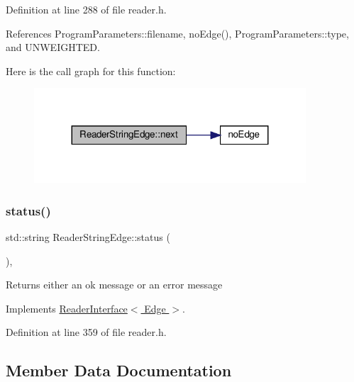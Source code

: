 Definition at line 288 of file reader.\+h.



References Program\+Parameters\+::filename, no\+Edge(), Program\+Parameters\+::type, and U\+N\+W\+E\+I\+G\+H\+T\+ED.

Here is the call graph for this function\+:
\nopagebreak
\begin{figure}[H]
\begin{center}
\leavevmode
\includegraphics[width=287pt]{classReaderStringEdge_a8de930135fa1fbb3a9610da2259e93ce_cgraph}
\end{center}
\end{figure}
\mbox{\label{classReaderStringEdge_a11fe073e85d07a48d0f0549b51af36b6}} 
\subsubsection{\texorpdfstring{status()}{status()}}
{\footnotesize\ttfamily std\+::string Reader\+String\+Edge\+::status (\begin{DoxyParamCaption}{ }\end{DoxyParamCaption})\hspace{0.3cm}{\ttfamily [inline]}, {\ttfamily [virtual]}}

\begin{DoxyReturn}{Returns}
either an ok message or an error message 
\end{DoxyReturn}


Implements \hyperlink{classReaderInterface_a5f86ed49eac808ed0a912f7d670c4042}{Reader\+Interface$<$ Edge $>$}.



Definition at line 359 of file reader.\+h.



\subsection{Member Data Documentation}
\mbox{\label{classReaderStringEdge_ac0b972f8b6c07ec0e70cc6c9a8531216}} 
